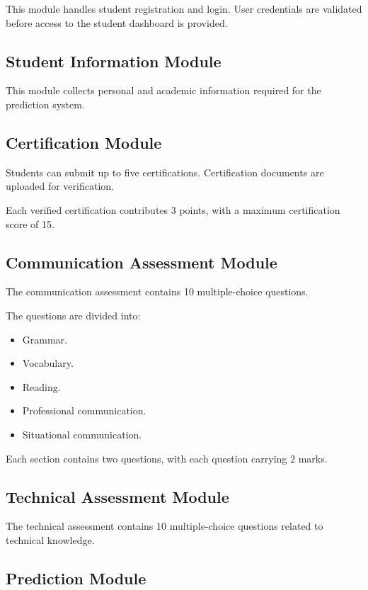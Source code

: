 \documentclass[12pt,a4paper]{report}
\begin{document}
This module handles student registration and login. User
credentials are validated before access to the student dashboard
is provided.

\subsection{Student Information Module}

This module collects personal and academic information required
for the prediction system.

\subsection{Certification Module}

Students can submit up to five certifications. Certification
documents are uploaded for verification.

Each verified certification contributes 3 points, with a maximum
certification score of 15.

\subsection{Communication Assessment Module}

The communication assessment contains 10 multiple-choice
questions.

The questions are divided into:

\begin{itemize}
    \item Grammar.
    \item Vocabulary.
    \item Reading.
    \item Professional communication.
    \item Situational communication.
\end{itemize}

Each section contains two questions, with each question carrying
2 marks.

\subsection{Technical Assessment Module}

The technical assessment contains 10 multiple-choice questions
related to technical knowledge.

\subsection{Prediction Module}
\end{document}

